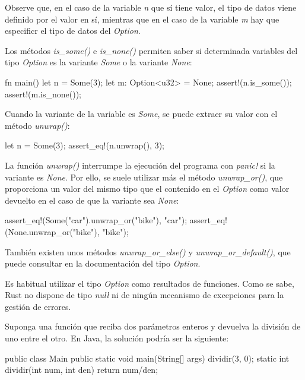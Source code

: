 Observe que, en el caso de la variable \textit{n} que sí tiene valor, el tipo de datos viene definido por el valor en sí, mientras que en el caso de la variable \textit{m} hay que especificr el tipo de datos del \textit{Option}.

Los métodos \textit{is\_some()} e \textit{is\_none()} permiten saber si determinada variables del tipo \textit{Option} es la variante \textit{Some} o la variante \textit{None}:

\vspace{0.7em}
\begin{Codigo}
   fn main() {
      let n = Some(3);
      let m: Option<u32> = None;
      assert!(n.is_some());
      assert!(m.is_none());
   }
\end{Codigo}

Cuando la variante de la variable es \textit{Some}, se puede extraer su valor con el método \textit{unwrap()}:

\vspace{0.7em}
\begin{Codigo}
   let n = Some(3);
   assert_eq!(n.unwrap(), 3);
\end{Codigo}

La función \textit{unwrap()} interrumpe la ejecución del programa con \textit{panic!} si la variante es \textit{None}. Por ello, se suele utilizar más el método \textit{unwrap\_or()}, que proporciona un valor del mismo tipo que el contenido en el \textit{Option} como valor devuelto en el caso de que la variante sea \textit{None}:

\vspace{0.7em}
\begin{Codigo}
   assert_eq!(Some("car").unwrap_or("bike"), "car");
   assert_eq!(None.unwrap_or("bike"), "bike");
\end{Codigo}

También existen unos métodos \textit{unwrap\_or\_else()} y \textit{unwrap\_or\_default()}, que puede consultar en la documentación del tipo \textit{Option}.

Es habitual utilizar el tipo \textit{Option} como resultados de funciones. Como se sabe, Rust no dispone de tipo \textit{null} ni de ningún mecanismo de excepciones para la gestión de errores. 

Suponga una función que reciba dos parámetros enteros y devuelva la división de uno entre el otro. En Java, la solución podría ser la siguiente:

\vspace{0.7em}
\begin{Codigo}
   public class Main {
      public static void main(String[] args) {
         dividir(3, 0);
      }
      static int dividir(int num, int den) {
         return num/den;
      }
   }
\end{Codigo}

